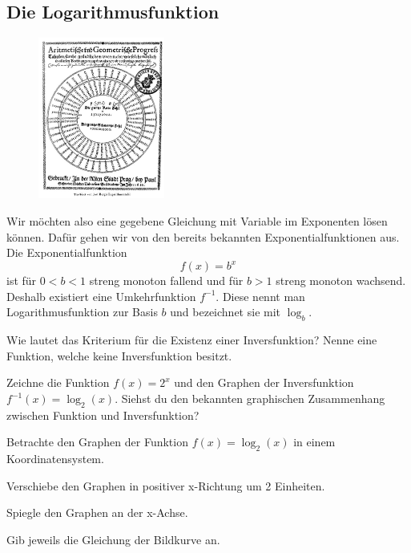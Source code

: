 \documentclass[%
11pt,%
twoside,%
titlepage,%
german,%
headsepline%
]{scrartcl}
\begin{document}
\subsection{Die Logarithmusfunktion}
  \begin{figure}
  \begin{center}
    \includegraphics[width=0.37\textwidth]{pictures/logarithmentafel}
  \end{center}
\end{figure}
Wir möchten also eine gegebene Gleichung mit Variable im Exponenten lösen können. Dafür gehen wir von den bereits bekannten Exponentialfunktionen aus. Die Exponentialfunktion
$$f(x)=b^x$$
ist für $0<b<1$ streng monoton fallend und für $b>1$ streng monoton wachsend. Deshalb existiert eine Umkehrfunktion $f^{-1}$. Diese nennt man Logarithmusfunktion zur Basis $b$ und bezeichnet sie mit $\log_b$.

\begin{ueb}
Wie lautet das Kriterium für die Existenz einer Inversfunktion? Nenne eine Funktion, welche keine Inversfunktion besitzt.
\end{ueb} 

\begin{ueb}
Zeichne die Funktion $f(x)=2^x$ und den Graphen der Inversfunktion $f^{-1}(x)=\log_2(x)$. Siehst du den bekannten graphischen Zusammenhang zwischen Funktion und Inversfunktion?
\end{ueb}

\begin{ueb}[verschieben]
Betrachte den Graphen der Funktion $f(x)=\log_2(x)$ in einem Koordinatensystem.
\begin{enumeratea}
\item Verschiebe den Graphen in positiver x-Richtung um 2 Einheiten.
\item Spiegle  den Graphen an der x-Achse.
\end{enumeratea}
Gib jeweils die Gleichung der Bildkurve an.
\end{ueb}
\end{document}
